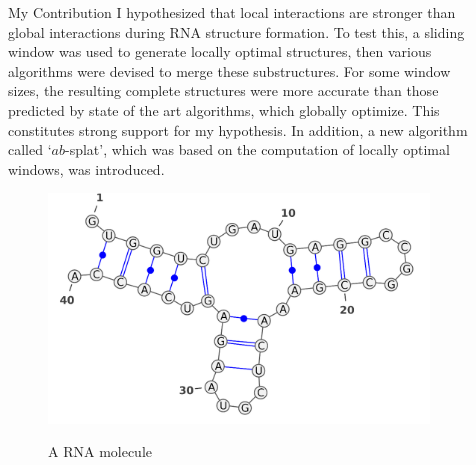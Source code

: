 \documentclass[final]{beamer}
\newlength{\sepwid}
\newlength{\onecolwid}
\begin{document}
\begin{frame}[t]
\begin{columns}[t]
\begin{column}{\onecolwid}
      \begin{block}{My Contribution}
		        I hypothesized that local interactions are stronger than global interactions during RNA structure formation. To test this, a sliding window was used to generate locally optimal structures, then various algorithms were devised to merge these substructures. For some window sizes, the resulting complete structures were more accurate than those predicted by state of the art algorithms, which globally optimize. This constitutes strong support for my hypothesis. In addition, a new algorithm called `$ab$-splat', which was based on the computation of locally optimal windows, was introduced.
        \vspace{0.25in}
        \begin{figure}
          \begin{center}
            \includegraphics[width=10in]{RNAexample.png} \\
            \caption{A RNA molecule}
            \label{fig:RNAexample}
          \end{center}
        \end{figure}
      \end{block}
    \end{column}
    
    
    
    
    
    \begin{column}{\sepwid}\end{column}			%
    \begin{column}{\onecolwid}
    
    
    

\end{column}
\end{columns}
\end{frame}
\end{document}
